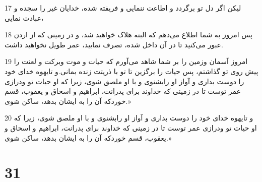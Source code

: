 \par 17 لیکن اگر دل تو برگردد و اطاعت ننمایی و فریفته شده، خدایان غیر را سجده و عبادت نمایی،
\par 18 پس امروز به شما اطلاع می‌دهم که البته هلاک خواهید شد، و در زمینی که از اردن عبور می‌کنید تا در آن داخل شده، تصرف نمایید، عمر طویل نخواهید داشت.
\par 19 امروز آسمان وزمین را بر شما شاهد می‌آورم که حیات و موت وبرکت و لعنت را پیش روی تو گذاشتم، پس حیات را برگزین تا تو با ذریتت زنده بمانی.و تایهوه خدای خود را دوست بداری و آواز او رابشنوی و با او ملصق شوی، زیرا که او حیات تو ودرازی عمر توست تا در زمینی که خداوند برای پدرانت، ابراهیم و اسحاق و یعقوب، قسم خوردکه آن را به ایشان بدهد، ساکن شوی.»
\par 20 و تایهوه خدای خود را دوست بداری و آواز او رابشنوی و با او ملصق شوی، زیرا که او حیات تو ودرازی عمر توست تا در زمینی که خداوند برای پدرانت، ابراهیم و اسحاق و یعقوب، قسم خوردکه آن را به ایشان بدهد، ساکن شوی.»
 
\chapter{31}

